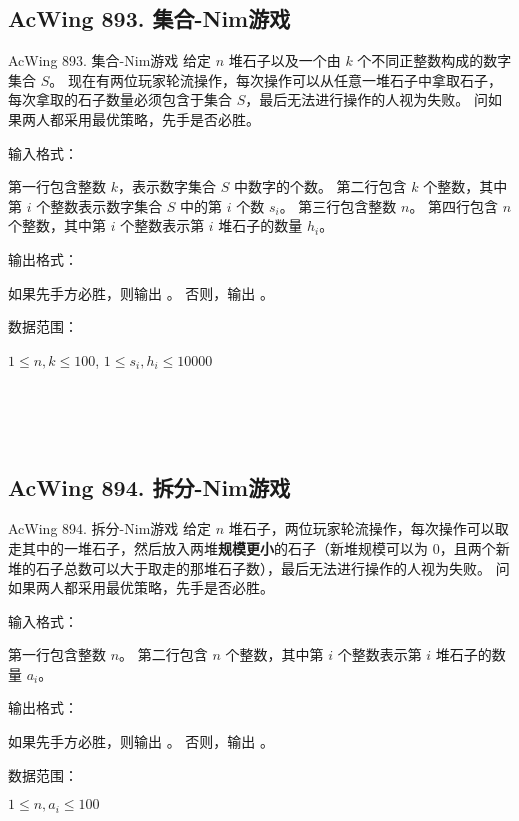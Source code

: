 \subsection{AcWing 893. 集合-Nim游戏}
\begin{titledbox}{AcWing 893. 集合-Nim游戏}
    给定 $n$ 堆石子以及一个由 $k$ 个不同正整数构成的数字集合 $S$。 现在有两位玩家轮流操作，每次操作可以从任意一堆石子中拿取石子，每次拿取的石子数量必须包含于集合 $S$，最后无法进行操作的人视为失败。 问如果两人都采用最优策略，先手是否必胜。

    输入格式：

    第一行包含整数 $k$，表示数字集合 $S$ 中数字的个数。 第二行包含 $k$ 个整数，其中第 $i$ 个整数表示数字集合 $S$ 中的第 $i$ 个数 $s_i$。 第三行包含整数 $n$。 第四行包含 $n$ 个整数，其中第 $i$ 个整数表示第 $i$ 堆石子的数量 $h_i$。

    输出格式：

    如果先手方必胜，则输出 。 否则，输出 。

    数据范围：

    $1 \le n, k \le 100$, $1 \le s_i,h_i \le 10000$

    \begin{inputblock}
         \\
         \\
         \\
    \end{inputblock}
    \begin{outputblock}
    \end{outputblock}
\end{titledbox}

\subsection{AcWing 894. 拆分-Nim游戏}
\begin{titledbox}{AcWing 894. 拆分-Nim游戏}
    给定 $n$ 堆石子，两位玩家轮流操作，每次操作可以取走其中的一堆石子，然后放入两堆\textbf{规模更小}的石子（新堆规模可以为 $0$，且两个新堆的石子总数可以大于取走的那堆石子数），最后无法进行操作的人视为失败。 问如果两人都采用最优策略，先手是否必胜。

    输入格式：

    第一行包含整数 $n$。 第二行包含 $n$ 个整数，其中第 $i$ 个整数表示第 $i$ 堆石子的数量 $a_i$。

    输出格式：

    如果先手方必胜，则输出 。 否则，输出 。

    数据范围：

    $1 \le n, a_i \le 100$

    \begin{inputblock}
         \\
    \end{inputblock}
    \begin{outputblock}
    \end{outputblock}
\end{titledbox}
